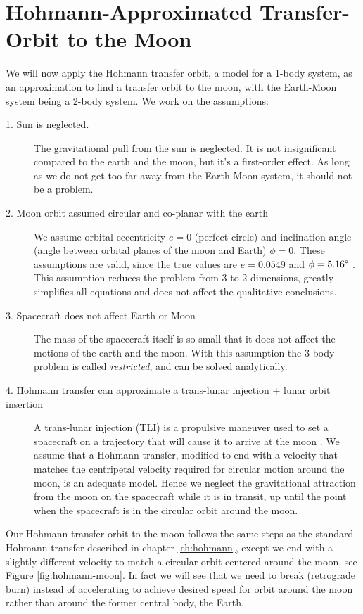\section{Hohmann-Approximated Transfer-Orbit to the Moon} \label{ch:hohmann-moon}
We will now apply the Hohmann transfer orbit, a model for a 1-body system, as an approximation to find a transfer orbit to the moon, with the Earth-Moon system being a 2-body system. We work on the assumptions:
\begin{description}
    \item[1. Sun is neglected.] The gravitational pull from the sun is neglected. It is not insignificant compared to the earth and the moon, but it's a first-order effect. As long as we do not get too far away from the Earth-Moon system, it should not be a problem.
    \item[2. Moon orbit assumed circular and co-planar with the earth] We assume orbital eccentricity $e = 0$ (perfect circle) and inclination angle (angle between orbital planes of the moon and Earth) $\phi = 0$. These assumptions are valid, since the true values are $e = 0.0549$ and $\phi = 5.16 \degree$ \cite{ma}. This assumption reduces the problem from 3 to 2 dimensions, greatly simplifies all equations and does not affect the qualitative conclusions.
    \item[3. Spacecraft does not affect Earth or Moon] The mass of the spacecraft itself is so small that it does not affect the motions of the earth and the moon. With this assumption the 3-body problem is called \emph{restricted}, and can be solved analytically.
    \item[4. Hohmann transfer can approximate a trans-lunar injection + lunar orbit insertion] A trans-lunar injection (TLI) is a propulsive maneuver used to set a spacecraft on a trajectory that will cause it to arrive at the moon \cite{NASA1966}. We assume that a Hohmann transfer, modified to end with a velocity that matches the centripetal velocity required for circular motion around the moon, is an adequate model. Hence we neglect the gravitational attraction from the moon on the spacecraft while it is in transit, up until the point when the spacecraft is in the circular orbit around the moon.
\end{description}

Our Hohmann transfer orbit to the moon follows the same steps as the standard Hohmann transfer described in chapter \ref{ch:hohmann}, except we end with a slightly different velocity to match a circular orbit centered around the moon, see Figure \ref{fig:hohmann-moon}. In fact we will see that we need to break (retrograde burn) instead of accelerating to achieve desired speed for orbit around the moon rather than around the former central body, the Earth.

